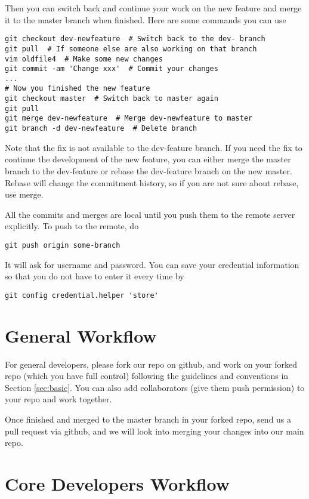 \documentclass[runningheads,letterpaper]{llncs}
\begin{document}
Then you can switch back and continue your work on the new feature and merge it to the master branch when finished.
Here are some commands you can use
\begin{verbatim}
git checkout dev-newfeature  # Switch back to the dev- branch
git pull  # If someone else are also working on that branch
vim oldfile4  # Make some new changes
git commit -am 'Change xxx'  # Commit your changes
...
# Now you finished the new feature
git checkout master  # Switch back to master again
git pull
git merge dev-newfeature  # Merge dev-newfeature to master
git branch -d dev-newfeature  # Delete branch
\end{verbatim}

Note that the fix is not available to the dev-feature branch.
If you need the fix to continue the development of the new feature, you can either merge the master branch to the dev-feature or rebase the dev-feature branch on the new master.
Rebase will change the commitment history, so if you are not sure about rebase, use merge.

All the commits and merges are local until you push them to the remote server explicitly.
To push to the remote, do
\begin{verbatim}
git push origin some-branch
\end{verbatim}
It will ask for username and password.
You can save your credential information so that you do not have to enter it every time by
\begin{verbatim}
git config credential.helper 'store'
\end{verbatim}

\section{General Workflow}

For general developers, please fork our repo on github, and work on your forked repo (which you have full control) following the guidelines and conventions in Section \ref{sec:basic}.
You can also add collaborators (give them push permission) to your repo and work together.

Once finished and merged to the master branch in your forked repo, send us a pull request via github, and we will look into merging your changes into our main repo.

\section{Core Developers Workflow}
\end{document}
